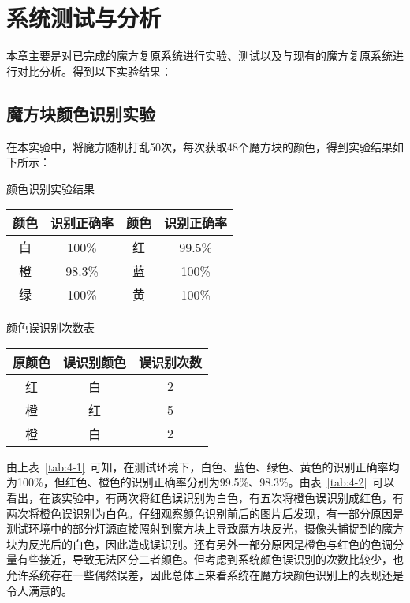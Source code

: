 
\chapter{系统测试与分析}

本章主要是对已完成的魔方复原系统进行实验、测试以及与现有的魔方复原系统进行对比分析。得到以下实验结果：

\section{魔方块颜色识别实验}

在本实验中，将魔方随机打乱50次，每次获取48个魔方块的颜色，得到实验结果如下所示：

\noindent
\begin{minipage}{\textwidth}
	\vspace{1.0em}
	\begin{minipage}[t]{0.48\textwidth}
		\makeatletter{}
		\caption{颜色识别实验结果}
		\label{tab:4-1}
		\vspace{1.5em}
		\begin{tabular}{cccc}
			\toprule
			颜色&识别正确率&颜色&识别正确率 \\
			\midrule
			白&100\%&红&99.5\%\\
			橙&98.3\%&蓝&100\%\\
			绿&100\%&黄&100\%\\
			\bottomrule
		\end{tabular}
	\end{minipage}
	\hfill
	\begin{minipage}[t]{0.48\textwidth}
		\makeatletter{}
		\caption{颜色误识别次数表}
		\label{tab:4-2}
		\vspace{1.5em}
		\begin{tabular}{ccc}
			\toprule
			原颜色&误识别颜色&误识别次数\\
			\midrule
			红&白&2\\
			橙&红&5\\
			橙&白&2\\
			\bottomrule
		\end{tabular}
	\end{minipage}
\end{minipage}
\vspace{0.5em}

由上表~\ref{tab:4-1}~可知，在测试环境下，白色、蓝色、绿色、黄色的识别正确率均为100\%，但红色、橙色的识别正确率分别为99.5\%、98.3\%。由表~\ref{tab:4-2}~可以看出，在该实验中，有两次将红色误识别为白色，有五次将橙色误识别成红色，有两次将橙色误识别为白色。仔细观察颜色识别前后的图片后发现，有一部分原因是测试环境中的部分灯源直接照射到魔方块上导致魔方块反光，摄像头捕捉到的魔方块为反光后的白色，因此造成误识别。还有另外一部分原因是橙色与红色的色调分量有些接近，导致无法区分二者颜色。但考虑到系统颜色误识别的次数比较少，也允许系统存在一些偶然误差，因此总体上来看系统在魔方块颜色识别上的表现还是令人满意的。

